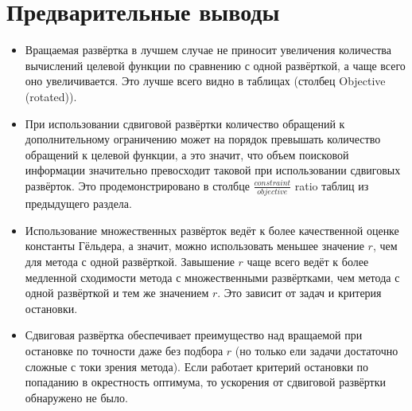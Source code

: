 \documentclass[a4paper]{article}
\begin{document}
\section{Предварительные выводы}
\begin{itemize}
  \item Вращаемая развёртка в лучшем случае не приносит увеличения количества вычислений целевой функции по сравнению с одной развёрткой, а чаще всего оно увеличивается. Это лучше всего видно в таблицах (столбец Objective (rotated)).
  \item При использовании сдвиговой развёртки количество обращений к дополнительному ограничению может на порядок превышать количество обращений к целевой функции, а это значит, что объем поисковой информации значительно превосходит таковой при использовании сдвиговых развёрток. Это продемонстрировано в столбце $\frac{constraint}{objective}$ ratio таблиц из предыдущего раздела.
  \item Использование множественных развёрток ведёт к более качественной оценке константы Гёльдера, а значит, можно использовать меньшее значение $r$, чем для метода с одной развёрткой. Завышение $r$ чаще всего ведёт к более медленной сходимости метода с множественными развёртками, чем метода с одной развёрткой и тем же значением $r$. Это зависит от задач и критерия остановки.
  \item Сдвиговая развёртка обеспечивает преимущество над вращаемой при остановке по точности даже без подбора $r$ (но только ели задачи достаточно сложные с токи зрения метода). Если работает критерий остановки по попаданию в окрестность оптимума, то ускорения от сдвиговой развёртки обнаружено не было.
\end{itemize}
\end{document}
